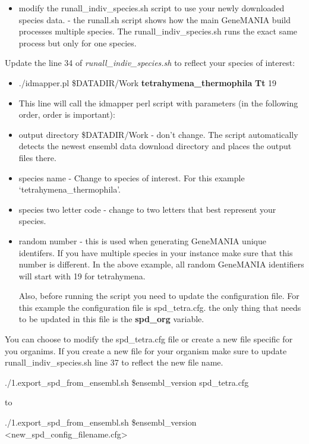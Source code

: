 \documentclass[]{book}
\providecommand{\tightlist}{%
  \setlength{\itemsep}{0pt}\setlength{\parskip}{0pt}}
\newenvironment{rmdblock}[1]
  {\begin{shaded*}
  \begin{itemize}
  \renewcommand{\labelitemi}{
    \raisebox{-.7\height}[0pt][0pt]{
      {\setkeys{Gin}{width=3em,keepaspectratio}\texttt{[image: images/\#1]}}
    }
  }
  \item
  }
  {
  \end{itemize}
  \end{shaded*}
  }
\newenvironment{rmd-tip}
  {\begin{rmdblock}{tip}}
  {\end{rmdblock}}
\begin{document}
\begin{itemize}
\tightlist
\item
  modify the runall\_indiv\_species.sh script to use your newly
  downloaded species data. - the runall.sh script shows how the main
  GeneMANIA build processes multiple species. The
  runall\_indiv\_species.sh runs the exact same process but only for one
  species.
\end{itemize}

Update the line 34 of \emph{runall\_indiv\_species.sh} to reflect your
species of interest:

\begin{itemize}
\item
  ./idmapper.pl \$DATADIR/Work \textbf{tetrahymena\_thermophila}
  \textbf{Tt} 19
\item
  This line will call the idmapper perl script with parameters (in the
  following order, order is important):
\item
  output directory \$DATADIR/Work - don't change. The script
  automatically detects the newest ensembl data download directory and
  places the output files there.
\item
  species name - Change to species of interest. For this example
  `tetrahymena\_thermophila'.
\item
  species two letter code - change to two letters that best represent
  your species.
\item
  random number - this is used when generating GeneMANIA unique
  identifers. If you have multiple species in your instance make sure
  that this number is different. In the above example, all random
  GeneMANIA identifiers will start with 19 for tetrahymena.

  Also, before running the script you need to update the configuration
  file. For this example the configuration file is spd\_tetra.cfg. the
  only thing that needs to be updated in this file is the
  \textbf{spd\_org} variable.
\end{itemize}

\begin{rmd-tip}
You can choose to modify the spd\_tetra.cfg file or create a new file
specific for you organims. If you create a new file for your organism
make sure to update runall\_indiv\_species.sh line 37 to reflect the new
file name.

./1.export\_spd\_from\_ensembl.sh \$ensembl\_version spd\_tetra.cfg

to

./1.export\_spd\_from\_ensembl.sh \$ensembl\_version
\textless{}new\_spd\_config\_filename.cfg\textgreater{}
\end{rmd-tip}
\end{document}
